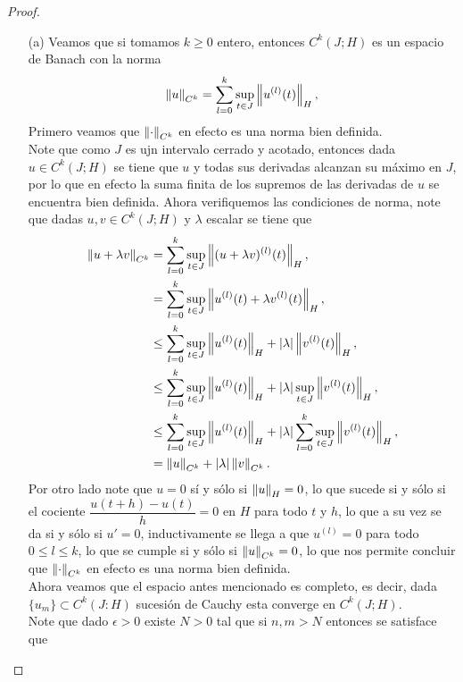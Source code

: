\begin{proof} 
  \begin{enumerate}
    \item[(a)] Veamos que si tomamos $k\geq 0$ entero, entonces $C^{k}(J;H)$ es un espacio de Banach con la norma
      \begin{align*}
        \left\|u\right\|_{C^{k}}=\sum_{l=0}^{k}\sup_{t\in J}\left\|u^{(l)}(t)\right\|_{H},
      \end{align*}
      Primero veamos que $\left\|\cdot\right\|_{C^{k}}$ en efecto es una norma bien definida.\\
      Note que como $J$ es ujn intervalo cerrado y acotado, entonces dada $u\in C^{k}(J;H)$ se tiene que $u$ y todas sus derivadas alcanzan su máximo en $J$, por lo que en efecto la suma finita de los supremos de las derivadas de $u$ se encuentra bien definida.
      Ahora verifiquemos las condiciones de norma, note que dadas $u,v\in C^{k}(J;H)$ y $\lambda$ escalar se tiene que
      \begin{align*}
        \left\|u+\lambda v\right\|_{C^{k}}&=\sum_{l=0}^{k}\sup_{t\in J}\left\|(u+\lambda v)^{(l)}(t)\right\|_{H},\\
        &=\sum_{l=0}^{k}\sup_{t\in J}\left\|u^{(l)}(t)+\lambda v^{(l)}(t)\right\|_{H},\\
        &\leq\sum_{l=0}^{k}\sup_{t\in J}\left\|u^{(l)}(t)\right\|_{H}+|\lambda| \left\|v^{(l)}(t)\right\|_{H},\\
        &\leq\sum_{l=0}^{k}\sup_{t\in J}\left\|u^{(l)}(t)\right\|_{H}+|\lambda|\sup_{t\in J} \left\|v^{(l)}(t)\right\|_{H},\\
        &\leq\sum_{l=0}^{k}\sup_{t\in J}\left\|u^{(l)}(t)\right\|_{H}+|\lambda|\sum_{l=0}^{k}\sup_{t\in J} \left\|v^{(l)}(t)\right\|_{H},\\
        &=\left\|u\right\|_{C^{k}}+|\lambda|\left\|v\right\|_{C^{k}}.
      \end{align*}
      Por otro lado note que $u=0$ sí y sólo si $\left\|u\right\|_{H}=0$, lo que sucede si y sólo si el cociente $\dfrac{u(t+h)-u(t)}{h}=0$ en $H$ para todo $t$ y $h$, lo que a su vez se da si y sólo si $u'=0$, inductivamente se llega a que $u^{(l)}=0$ para todo $0\leq l\leq k$, lo que se cumple si y sólo si $\left\|u\right\|_{C^{k}}=0$, lo que nos permite concluir que $\left\|\cdot\right\|_{C^{k}}$ en efecto es una norma bien definida.\\
      Ahora veamos que el espacio antes mencionado es completo, es decir, dada $\{u_{m}\}\subset C^{k}(J:H)$ sucesión de Cauchy esta converge en $C^{k}(J;H)$.\\
      Note que dado $\epsilon>0$ existe $N>0$ tal que si $n,m>N$ entonces se satisface que

\end{enumerate}
\end{proof}
